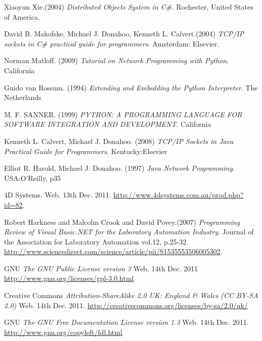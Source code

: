\begin{thebibliography}{9}
	 Xiaoyun Xie.(2004) \textit{Distributed Objects System in C\#.} Rochester, United States of America. 

	 David B. Makofske, Michael J. Donahoo, Kenneth L. Calvert.(2004) \textit{TCP/IP sockets in C\#  practical guide for programmers}. Amsterdam: Elsevier.

	 Norman Matloff. (2009) \textit{Tutorial on Network Programming with Python}. California

	 Guido van Rossum. (1994) \textit{Extending and Embedding the Python Interpreter}. The Netherlands

	 M. F. SANNER. (1999) \textit{PYTHON: A PROGRAMMING LANGUAGE FOR SOFTWARE
INTEGRATION AND DEVELOPMENT}. California

	 Kenneth L. Calvert, Michael J. Donahoo. (2008) \textit{TCP/IP Sockets in Java
Practical Guide for Programmers}. Kentucky:Elsevier

	 Elliot R. Harold, Michael J. Donahoo. (1997) \textit{Java Network Programming}. USA:O'Reilly, p35

	 4D Systems. Web. 13th Dec. 2011. \url{http://www.4dsystems.com.au/prod.php?id=82}.

	Robert Harkness and Malcolm Crook and David Povey.(2007) \textit{Programming Review of Visual Basic.NET for the Laboratory Automation Industry}. Journal of the Association for Laboratory Automation vol.12, p.25-32.
	\url{http://www.sciencedirect.com/science/article/pii/S1535553506005302}.

	 GNU \emph{The GNU Public License version 3} Web. 14th Dec. 2011 \url{http://www.gnu.org/licenses/gpl-3.0.html}

	 Creative Commons \emph{Attribution-ShareAlike 2.0 UK: England \& Wales (CC BY-SA 2.0)} Web. 14th Dec. 2011. \url{http://creativecommons.org/licenses/by-sa/2.0/uk/}
	
	 GNU \emph{The GNU Free Documentation License version 1.3} Web. 14th Dec. 2011. \url{http://www.gnu.org/copyleft/fdl.html}

\end{thebibliography} 
